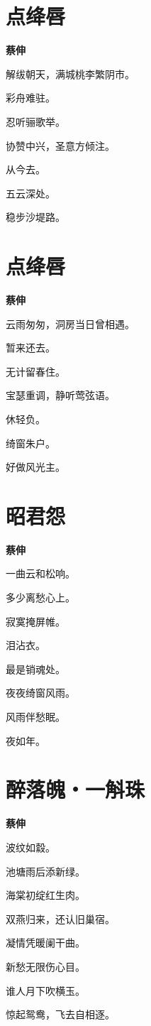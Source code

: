 \documentclass[12pt,a4paper]{ctexbook}
\begin{document}
\section{点绛唇}
\textbf{蔡伸}\par\vspace{0.5em}
解绂朝天，满城桃李繁阴市。\par
彩舟难驻。\par
忍听骊歌举。\par
协赞中兴，圣意方倾注。\par
从今去。\par
五云深处。\par
稳步沙堤路。\par

\section{点绛唇}
\textbf{蔡伸}\par\vspace{0.5em}
云雨匆匆，洞房当日曾相遇。\par
暂来还去。\par
无计留春住。\par
宝瑟重调，静听莺弦语。\par
休轻负。\par
绮窗朱户。\par
好做风光主。\par

\section{昭君怨}
\textbf{蔡伸}\par\vspace{0.5em}
一曲云和松响。\par
多少离愁心上。\par
寂寞掩屏帷。\par
泪沾衣。\par
最是销魂处。\par
夜夜绮窗风雨。\par
风雨伴愁眠。\par
夜如年。\par

\section{醉落魄・一斛珠}
\textbf{蔡伸}\par\vspace{0.5em}
波纹如縠。\par
池塘雨后添新绿。\par
海棠初绽红生肉。\par
双燕归来，还认旧巢宿。\par
凝情凭暖阑干曲。\par
新愁无限伤心目。\par
谁人月下吹横玉。\par
惊起鸳鸯，飞去自相逐。\par
\end{document}
